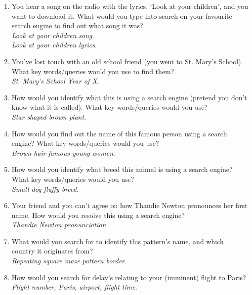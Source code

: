 \documentclass[a4paper, 11pt]{article}
\begin{document}
\begin{enumerate}
\item{You hear a song on the radio with the lyrics, `Look at your children', and you want to download it. What would you type into search on your favourite search engine to find out what song it was?\\\textit{Look at your children song}. \\\textit{Look at your children lyrics}.}
\item{You've lost touch with an old school friend (you went to St. Mary's School). What key words/queries would you use to find them?\\\textit{St. Mary's School Year of X}.}
\item{How would you identify what this is using a search engine (pretend you don't know what it is called). What key words/queries would you use?\\\textit{Star shaped brown plant}.}
\item{How would you find out the name of this famous person using a search engine? What key words/queries would you use?\\\textit{Brown hair famous young women}.}
\item{How would you identify what breed this animal is using a search engine? What key words/queries would you use?\\\textit{Small dog fluffy breed}.}
\item{Your friend and you can't agree on how Thandie Newton pronounces her first name. How would you resolve this using a search engine?\\\textit{Thandie Newton pronunciation}.}
\item{What would you search for to identify this pattern's name, and which country it originates from?\\\textit{Repeating square maze pattern border}.}
\item{How would you search for delay's relating to your (imminent) flight to Paris?\\\textit{Flight number, Paris, airport, flight time}.}
\end{enumerate}
\end{document}
